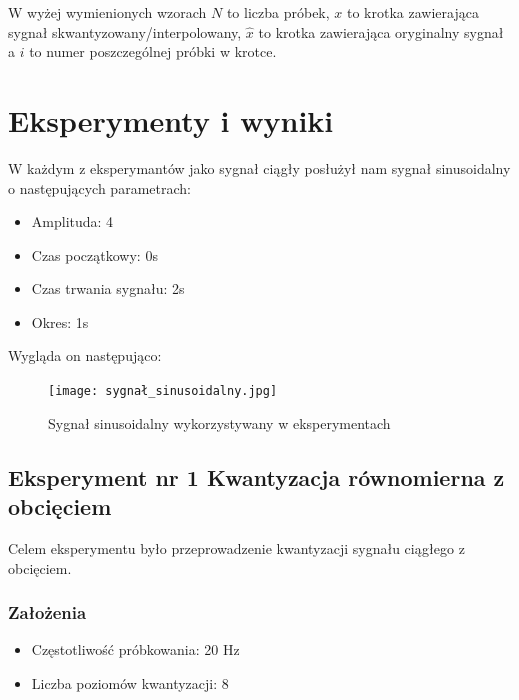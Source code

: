 \documentclass[12pt]{article}
\begin{document}
W wyżej wymienionych wzorach $N$ to liczba próbek, $x$ to krotka zawierająca sygnał skwantyzowany/interpolowany, $\hat{x}$ to krotka zawierająca oryginalny sygnał a $i$ to numer poszczególnej próbki w krotce. \\
\section{Eksperymenty i wyniki}

W każdym z eksperymantów jako sygnał ciągły posłużył nam sygnał sinusoidalny o następujących parametrach: 
\begin{itemize}
	\item Amplituda: 4
	\item Czas początkowy: 0s
	\item Czas trwania sygnału: 2s
	\item Okres: 1s
\end{itemize}
Wygląda on następująco:
\begin{figure}[H]
    \centering
	\texttt{[image: sygnał\_sinusoidalny.jpg]}
    \caption{Sygnał sinusoidalny wykorzystywany w eksperymentach}
    \label{wykres dla eksperymentu 1}
\end{figure}


\subsection{Eksperyment nr 1 Kwantyzacja równomierna z obcięciem}

Celem eksperymentu było przeprowadzenie kwantyzacji sygnału ciągłego z obcięciem.

\subsubsection{Założenia}

\begin{itemize}
    \item Częstotliwość próbkowania: 20 Hz
    \item Liczba poziomów kwantyzacji: 8
\end{itemize}
\end{document}
